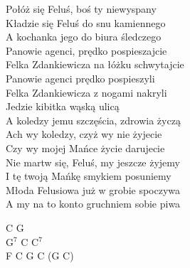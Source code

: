 \documentclass[a5paper, 10pt]{book}
\begin{document}
\begin{minipage}[t]{0.8\textwidth}
  Połóż się Feluś, boś ty niewyspany\vspace*{1.8mm}\\
  Kładzie się Feluś do snu kamiennego\\
  A kochanka jego do biura śledczego\vspace*{1.8mm}\\
  Panowie agenci, prędko pospieszajcie\\
  Felka Zdankiewicza na łóżku schwytajcie\vspace*{1.8mm}\\
  Panowie agenci prędko pospieszyli\\
  Felka Zdankiewicza z nogami nakryli\vspace*{1.8mm}\\
  Jedzie kibitka wąską ulicą\\
  A koledzy jemu szczęścia, zdrowia życzą\vspace*{1.8mm}\\
  Ach wy koledzy, czyż wy nie żyjecie\\
  Czy wy mojej Mańce życie darujecie\vspace*{1.8mm}\\
  Nie martw się, Feluś, my jeszcze żyjemy\\
  I tę twoją Mańkę smykiem posuniemy\vspace*{1.8mm}\\
  Młoda Felusiowa już w grobie spoczywa\\
  A my na to konto gruchniem sobie piwa\vspace*{1.8mm}\\
\end{minipage}
\begin{minipage}[t]{0.4\textwidth}
  C G\\
  G$^7$ C C$^7$\vspace*{2.2mm}\\
  F C G C (G C)\vspace*{2.2mm}\\

\end{minipage}

\newpage
\end{document}
